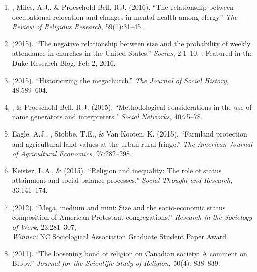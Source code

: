 \begin{enumerate}
\item \Eagle, Miles, A.J., \& Proeschold-Bell, R.J. (2016). ``The relationship between occupational relocation and changes in mental health among clergy.'' \emph{The Review of Religious Research}, 59(1):31--45. 

\item \Eagle \hspace{.01em} (2015). ``The negative relationship between size and the probability of weekly attendance in churches in the United States.'' \emph{Socius}, 2:1--10.  . Featured in the Duke Research Blog, Feb 2, 2016.

\item \Eagle \hspace{.01em} (2015). ``Historicizing the megachurch.'' \textit{The Journal of Social History}, 48:589--604. 

\item \Eagle, \& Proeschold-Bell, R.J. (2015). ``Methodological considerations in the use of name generators and interpreters." \emph{Social Networks}, 40:75--78. 

\item Eagle, A.J., \Eagle, Stobbe, T.E., \& Van Kooten, K. (2015). ``Farmland protection and agricultural land values at the urban-rural fringe.'' \emph{The American Journal of Agricultural Economics}, 97:282--298. 

\item Keister, L.A., \& \Eagle \hspace{.01em} (2015). ``Religion and inequality: The role of status attainment and social balance processes." \emph{Social Thought and Research}, 33:141--174.

\item \Eagle \hspace{.01em} (2012). ``Mega, medium and mini: Size and the socio-economic status composition of American Protestant congregations.'' \emph{Research in the Sociology of Work}, 23:281--307, \\ \emph{Winner:} NC Sociological Association Graduate Student Paper Award.

\item \Eagle \hspace{.01em} (2011). ``The loosening bond of religion on Canadian society: A comment on Bibby.'' \emph{Journal for the Scientific Study of Religion}, 50(4): 838--839.


\end{enumerate}

